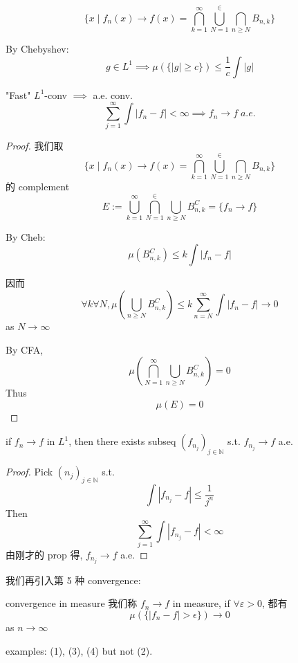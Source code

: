 \documentclass[lang=cn,11pt]{elegantbook}
\begin{document}
\[
\{ x \mid f_n(x) \rightarrow f(x) = \bigcap_{k=1}^\infty \bigcup_{N=1}^\in \bigcap_{n \geq N} B_{n,k}
 \}
\]


By Chebyshev:
\[
g \in L^1 \implies \mu(\{ |g| \geq c\}) \leq \frac{1}{c} \int |g|
\]





\begin{proposition}{"Fast" $L^1$-conv $\implies$ a.e. conv.}
\[
\sum_{j=1}^\infty \int  |f_n-f| < \infty \implies f_n\rightarrow f \;a.e.
\]
\end{proposition}

\begin{proof}
    我们取\[
\{ x \mid f_n(x) \rightarrow f(x) = \bigcap_{k=1}^\infty \bigcup_{N=1}^\in \bigcap_{n \geq N} B_{n,k}\}\] 的 complement
\[E := \bigcup_{k=1}^\infty \bigcap_{N=1}^\in \bigcup_{n \geq N} B_{n,k}^C = \{f_n \rightarrow f\}\]


By Cheb:\[ \mu(B_{n,k}^C)  \leq k \int |f_n-f|\]

因而 \[ \forall k \forall N , \mu(\bigcup_{n\geq N} B_{n,k}^C) \leq k \sum_{n=N}^\infty \int |f_n-f|  \rightarrow 0\]
 as $N\rightarrow \infty$

By CFA, \[ \mu (\bigcap_{N=1}^\infty\bigcup_{n\geq N} B_{n,k}^C)  =0\]
Thus
\[\mu(E) = 0\]
\end{proof}



\begin{corollary}
    if $f_n \rightarrow f$ in $L^1$, then there exists subseq $(f_{n_j})_{j\in \mathbb{N}}$ s.t. 
    $f_{n_j} \rightarrow f$ a.e.
\end{corollary}
\begin{proof}
    Pick $(n_j)_{j\in\mathbb{N}}$ s.t. 
    \[
    \int |f_{n_j} - f| \leq \frac{1}{j^n}
    \]
    Then \[
    \sum_{j=1}^\infty \int |f_{n_j}-f| < \infty
    \]
    由刚才的 prop 得, $f_{n_j}\rightarrow f$ a.e.
\end{proof}




我们再引入第 5 种 convergence: 
\begin{definition}{convergence in measure}
    我们称 $f_n \rightarrow f$ in measure, if $\forall \varepsilon >0$, 都有 \[
    \mu(\{|f_n-f| > \epsilon\}) \rightarrow 0
    \] as $n\rightarrow \infty$
\end{definition}

examples: (1), (3), (4) but not (2).
\end{document}

